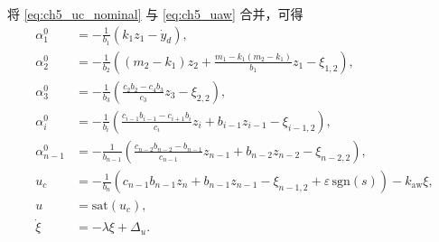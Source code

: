 将 \eqref{eq:ch5_uc_nominal} 与 \eqref{eq:ch5_uaw} 合并，可得
\begin{subequations}\label{eq:ch5_final}
\begin{align}
\alpha_1^0&=-\frac{1}{b_1}\left(k_1z_1-\dot y_d\right),\\
\alpha_2^0&=-\frac{1}{b_2}\left((m_2-k_1)z_2+\frac{m_1-k_1(m_2-k_1)}{b_1}z_1-\xi_{1,2}\right),\\
\alpha_3^0&=-\frac{1}{b_3}\left(\frac{c_2b_2-c_4b_3}{c_3}z_3-\xi_{2,2}\right),\\
\alpha_i^0&=-\frac{1}{b_i}\left(\frac{c_{i-1}b_{i-1}-c_{i+1}b_i}{c_i}z_i+b_{i-1}z_{i-1}-\xi_{i-1,2}\right),\\
\alpha_{n-1}^0&=-\frac{1}{b_{n-1}}\left(\frac{c_{n-2}b_{n-2}-b_{n-1}}{c_{n-1}}z_{n-1}+b_{n-2}z_{n-2}-\xi_{n-2,2}\right),\\
u_c&=-\frac{1}{b_n}\left(c_{n-1}b_{n-1}z_n+b_{n-1}z_{n-1}-\xi_{n-1,2}
+\varepsilon\,\mathrm{sgn}(s)\right)-k_{\mathrm{aw}}\xi,\\
u&=\mathrm{sat}(u_c),\\
\dot\xi&=-\lambda\xi+\Delta_u.
\end{align}
\end{subequations}

